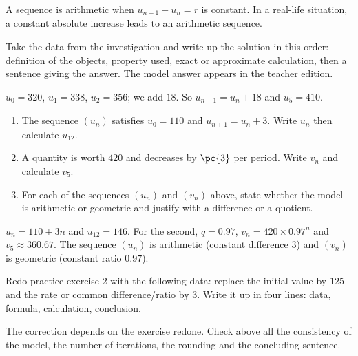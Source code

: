     \begin{summary}A sequence is arithmetic when $u_{n+1}-u_n=r$ is constant. In a real-life situation, a constant absolute increase leads to an arithmetic sequence.\end{summary}

    \begin{example}
    Take the data from the investigation and write up the solution in this order: definition of the objects, property used, exact or approximate calculation, then a sentence giving the answer. The model answer appears in the teacher edition.
    \end{example}
    \begin{solution}$u_0=320$, $u_1=338$, $u_2=356$; we add $18$. So $u_{n+1}=u_n+18$ and $u_5=410$.\end{solution}

    \begin{exercise}[essential]
    \begin{enumerate}\item The sequence $(u_n)$ satisfies $u_0=110$ and $u_{n+1}=u_n+3$. Write $u_n$ then calculate $u_{12}$.\item A quantity is worth $420$ and decreases by $\pc{3}$ per period. Write $v_n$ and calculate $v_5$.\item For each of the sequences $(u_n)$ and $(v_n)$ above, state whether the model is arithmetic or geometric and justify with a difference or a quotient.\end{enumerate}
    \end{exercise}
    \begin{solution}$u_n=110+3n$ and $u_{12}=146$. For the second, $q=\num{0,97}$, $v_n=420\times\num{0,97}^n$ and $v_5\approx\num{360,67}$. The sequence $(u_n)$ is arithmetic (constant difference $3$) and $(v_n)$ is geometric (constant ratio $\num{0,97}$).\end{solution}


    \begin{homework}Redo practice exercise 2 with the following data: replace the initial value by $125$ and the rate or common difference/ratio by $3$. Write it up in four lines: data, formula, calculation, conclusion.\end{homework}
    \begin{solution}The correction depends on the exercise redone. Check above all the consistency of the model, the number of iterations, the rounding and the concluding sentence.\end{solution}

